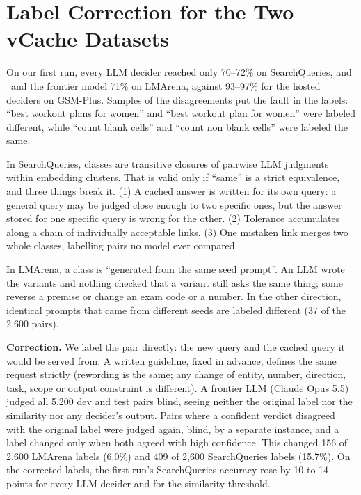 \raggedbottom %

\section{Label Correction for the Two vCache Datasets}
\label{app:labels}

On our first run, every LLM decider reached only 70--72\% on SearchQueries, and \jev\ and the frontier model 71\% on LMArena, against 93--97\% for the hosted deciders on GSM-Plus.
Samples of the disagreements put the fault in the labels: ``best workout plans for women'' and ``best workout plan for women'' were labeled different, while ``count blank cells'' and ``count non blank cells'' were labeled the same.

In SearchQueries, classes are transitive closures of pairwise LLM judgments within embedding clusters.
That is valid only if ``same'' is a strict equivalence, and three things break it.
(1) A cached answer is written for its own query: a general query may be judged close enough to two specific ones, but the answer stored for one specific query is wrong for the other.
(2) Tolerance accumulates along a chain of individually acceptable links.
(3) One mistaken link merges two whole classes, labelling pairs no model ever compared.

In LMArena, a class is ``generated from the same seed prompt''.
An LLM wrote the variants and nothing checked that a variant still asks the same thing; some reverse a premise or change an exam code or a number.
In the other direction, identical prompts that came from different seeds are labeled different (37 of the 2,600 pairs).

\textbf{Correction.} We label the pair directly: the new query and the cached query it would be served from.
A written guideline, fixed in advance, defines the same request strictly (rewording is the same; any change of entity, number, direction, task, scope or output constraint is different).
A frontier LLM (Claude Opus 5.5) judged all 5,200 dev and test pairs blind, seeing neither the original label nor the similarity nor any decider's output.
Pairs where a confident verdict disagreed with the original label were judged again, blind, by a separate instance, and a label changed only when both agreed with high confidence.
This changed 156 of 2,600 LMArena labels (6.0\%) and 409 of 2,600 SearchQueries labels (15.7\%).
On the corrected labels, the first run's SearchQueries accuracy rose by 10 to 14 points for every LLM decider and for the similarity threshold.

